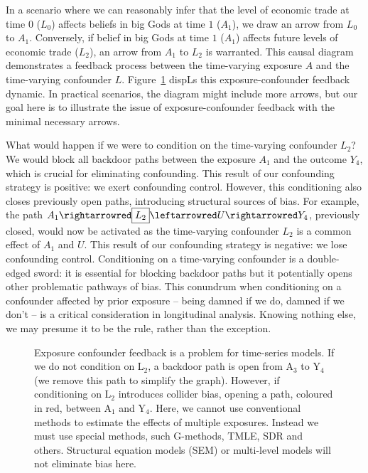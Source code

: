 \documentclass[
  singlecolumn]{article}
\begin{document}
In a scenario where we can reasonably infer that the level of economic
trade at time \(0\) (\(L_{0}\)) affects beliefs in big Gods at time
\(1\) (\(A_{1}\)), we draw an arrow from \(L_{0}\) to \(A_{1}\).
Conversely, if belief in big Gods at time \(1\) (\(A_{1}\)) affects
future levels of economic trade (\(L_{2}\)), an arrow from \(A_{1}\) to
\(L_{2}\) is warranted. This causal diagram demonstrates a feedback
process between the time-varying exposure \(A\) and the time-varying
confounder \(L\). Figure~\ref{fig-dag-9} dispLs this exposure-confounder
feedback dynamic. In practical scenarios, the diagram might include more
arrows, but our goal here is to illustrate the issue of
exposure-confounder feedback with the minimal necessary arrows.

What would happen if we were to condition on the time-varying confounder
\(L_{2}\)? We would block all backdoor paths between the exposure
\(A_{1}\) and the outcome \(Y_{4}\), which is crucial for eliminating
confounding. This result of our confounding strategy is positive: we
exert confounding control. However, this conditioning also closes
previously open paths, introducing structural sources of bias. For
example, the path
\(A_{1} \rightarrowred \boxed{ L_{2}} \leftarrowred U \rightarrowred Y_{4}\),
previously closed, would now be activated as the time-varying confounder
\(\boxed{ L_{2}}\) is a common effect of \(A_{1}\) and \(U\). This
result of our confounding strategy is negative: we lose confounding
control. Conditioning on a time-varying confounder is a double-edged
sword: it is essential for blocking backdoor paths but it potentially
opens other problematic pathways of bias. This conundrum when
conditioning on a confounder affected by prior exposure -- being damned
if we do, damned if we don't -- is a critical consideration in
longitudinal analysis. Knowing nothing else, we may presume it to be the
rule, rather than the exception.

\begin{figure}


\caption{\label{fig-dag-9}Exposure confounder feedback is a problem for
time-series models. If we do not condition on L\(_2\), a backdoor path
is open from A\(_3\) to Y\(_4\) (we remove this path to simplify the
graph). However, if conditioning on L\(_2\) introduces collider bias,
opening a path, coloured in red, between A\(_1\) and Y\(_4\). Here, we
cannot use conventional methods to estimate the effects of multiple
exposures. Instead we must use special methods, such G-methods, TMLE,
SDR and others. Structural equation models (SEM) or multi-level models
will not eliminate bias here.}

\end{figure}%
\end{document}
